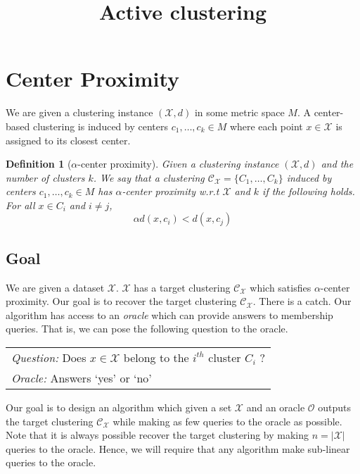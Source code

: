 \documentclass[11pt]{article}
\title{\LARGE Active clustering}
\author{}
\newtheorem{definition}[theorem]{Definition}
\newcommand{\mc}{\mathcal}
\begin{document}
\maketitle

\section{Center Proximity}
We are given a clustering instance $(\mc X, d)$ in some metric space $M$. A center-based clustering is induced by centers $c_1, \ldots, c_k \in M$ where each point $x \in \mc X$ is assigned to its closest center.

\begin{definition}[$\alpha$-center proximity]
\label{defn:alphacp}
Given a clustering instance $(\mc X, d)$ and the number of clusters $k$. We say that a clustering $\mc C_{\mc X} = \{C_1, \ldots, C_k\}$ induced by centers $c_1, \ldots, c_k \in M$ has $\alpha$-center proximity w.r.t $\mc X$ and $k$ if the following holds. For all $x \in C_i$ and $i\neq j$, 
$$\alpha d(x, c_i) < d(x, c_j)$$
\end{definition}

\subsection{Goal}
We are given a dataset $\mc X$. $\mc X$ has a target clustering $\mc C_{\mc X}$ which satisfies $\alpha$-center proximity. Our goal is to recover the target clustering $\mc C_{\mc X}$. There is a catch. Our algorithm has access to an {\it oracle} which can provide answers to membership queries. That is, we can pose the following question to the oracle.
\begin{center}
  \begin{tabular}{l}
	{\it Question:} Does $x \in \mc X$ belong to the $i^{th}$ cluster $C_i$ ? \\
	{\it Oracle:} Answers `yes' or `no'
  \end{tabular}
\end{center}

\noindent Our goal is to design an algorithm which given a set $\mc X$ and an oracle $\mc O$ outputs the target clustering $\mc C_{\mc X}$ while making as few queries to the oracle as possible. Note that it is always possible recover the target clustering by making $n = |\mc X|$ queries to the oracle. Hence, we will require that any algorithm make sub-linear queries to the oracle. 
\end{document}
